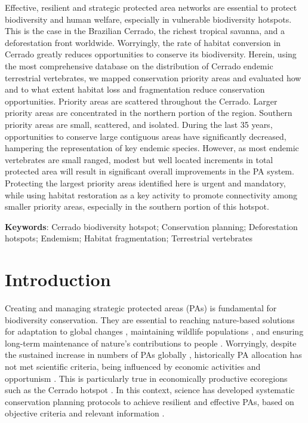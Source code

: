\documentclass[12pt,openright,oneside,a4paper,english]{abntex2}
\begin{document}
\begin{resumo}
	\noindent
	Effective, resilient and strategic protected area networks are essential to protect biodiversity and human welfare, especially in vulnerable biodiversity hotspots. This is the case in the Brazilian Cerrado, the richest tropical savanna, and a deforestation front worldwide. Worryingly, the rate of habitat conversion in Cerrado greatly reduces opportunities to conserve its biodiversity. Herein, using the most comprehensive database on the distribution of Cerrado endemic terrestrial vertebrates, we mapped conservation priority areas and evaluated how and to what extent habitat loss and fragmentation reduce conservation opportunities. Priority areas are scattered throughout the Cerrado. Larger priority areas are concentrated in the northern portion of the region. Southern priority areas are small, scattered, and isolated. During the last 35 years, opportunities to conserve large contiguous areas have significantly decreased, hampering the representation of key endemic species. However, as most endemic vertebrates are small ranged, modest but well located increments in total protected area will result in significant overall improvements in the PA system. Protecting the largest priority areas identified here is urgent and mandatory, while using habitat restoration as a key activity to promote connectivity among smaller priority areas, especially in the southern portion of this hotspot.
	
	\vspace{\medskipamount}
	\noindent
	\textbf{Keywords}: Cerrado biodiversity hotspot; Conservation planning; Deforestation hotspots; Endemism; Habitat fragmentation; Terrestrial vertebrates

\end{resumo}

\setlength{\parindent}{1cm}

\section{Introduction}

Creating and managing strategic protected areas (PAs) is fundamental for biodiversity conservation. They are essential to reaching nature-based solutions for adaptation to global changes \citep{Maxwell2020}, maintaining wildlife populations \citep{Geldmann2013}, and ensuring long-term maintenance of nature’s contributions to people \citep{Diaz2018}. Worryingly, despite the sustained increase in numbers of PAs globally \citep{Maxwell2020}, historically PA allocation has not met scientific criteria, being influenced by economic activities and opportunism \citep{Margules2000}. This is particularly true in economically productive ecoregions \citep{PrietoTorres2022} such as the Cerrado hotspot \citep{Strassburg2017, Vieira2019}. In this context, science has developed systematic conservation planning protocols to achieve resilient and effective PAs, based on objective criteria and relevant information \citep{Margules2000, DiMinin2014}.
\end{document}
